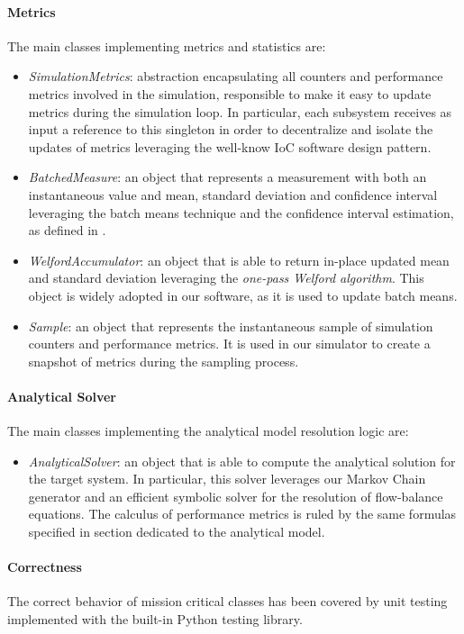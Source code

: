 \paragraph{Metrics}
The main classes implementing metrics and statistics are:

\begin{itemize}
	
	\item \textit{SimulationMetrics}: abstraction encapsulating all counters and performance metrics involved in the simulation, responsible to make it easy to update metrics during the simulation loop. In particular, each subsystem receives as input a reference to this singleton in order to decentralize and isolate the updates of metrics leveraging the well-know IoC software design pattern.
	
	\item \textit{BatchedMeasure}: an object that represents a measurement with both an instantaneous value and mean, standard deviation and confidence interval leveraging the batch means technique and the confidence interval estimation, as defined in \cite{leemis2006discrete}.
	
	\item \textit{WelfordAccumulator}: an object that is able to return in-place updated mean and standard deviation leveraging the \textit{one-pass Welford algorithm}. This object is widely adopted in our software, as it is used to update batch means.
	
	\item \textit{Sample}: an object that represents the instantaneous sample of simulation counters and performance metrics. It is used in our simulator to create a snapshot of metrics during the sampling process.
	
\end{itemize}

\paragraph{Analytical Solver}
The main classes implementing the analytical model resolution logic are:

\begin{itemize}

	\item \textit{AnalyticalSolver}: an object that is able to compute the analytical solution for the target system. In particular, this solver leverages our Markov Chain generator and an efficient symbolic solver for the resolution of flow-balance equations. The calculus of performance metrics is ruled by the same formulas specified in section dedicated to the analytical model.

\end{itemize}

\paragraph{Correctness}
The correct behavior of mission critical classes has been covered by unit testing implemented with the built-in Python testing library.